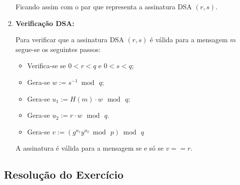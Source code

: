\documentclass[12pt]{report}
\providecommand{\tightlist}{%
      \setlength{\itemsep}{0pt}\setlength{\parskip}{0pt}}
\begin{document}
\begin{enumerate}
  Ficando assim com o par que representa a assinatura DSA \((r,s)\).
\vspace{6 mm}
\item
  \textbf{Verificação DSA:}

  Para verificar que a assinatura DSA \((r,s)\) é válida para a
  mensagem \(m\) segue-se os seguintes passos:

  \begin{itemize}
  \tightlist
  \item
    Verifica-se se \(0 < r < q\) e \(0 < s < q\);
\vspace{2 mm}
  \item
    Gera-se $w:=s^{-1}{\bmod {\,}}q$;
\vspace{2 mm}
  \item
    Gera-se \(u_1 := H(m) \cdot w\, \bmod\,q\);
\vspace{2 mm}
  \item
    Gera-se \(u_2 := r \cdot w\, \bmod\,q\).
\vspace{2 mm}
  \item
    Gera-se $v:=\left(g^{u_{1}}y^{u_{2}}{\bmod {\,}}p\right){\bmod {\,}}q$
  \end{itemize}

  A assinatura é válida para a mensagem se e só se \(v == r\).
\end{enumerate}
\vspace{5 mm}
\subsection{Resolução do
Exercício}\label{resoluuxe7uxe3o-do-exercuxedcio}
\end{document}
